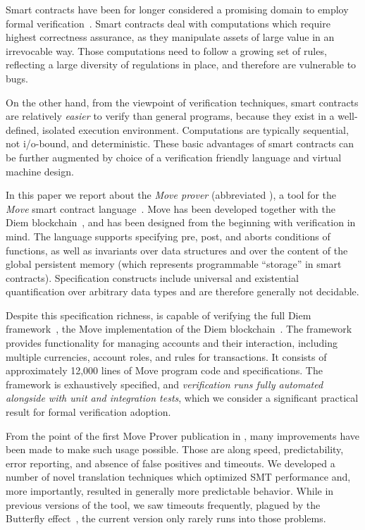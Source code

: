 
Smart contracts have been for longer considered a promising domain to employ
formal verification~\cite{CONTRACT_VERIFICATION}.  Smart contracts deal with
computations which require highest correctness assurance, as they manipulate
assets of large value in an irrevocable way. Those computations need to follow
a growing set of rules, reflecting a large diversity of regulations in place,
and therefore are vulnerable to bugs.

On the other hand, from the viewpoint of verification techniques, smart
contracts are relatively \emph{easier} to verify than general programs,
because they exist in a well-defined, isolated execution environment.
Computations are typically sequential, not i/o-bound, and deterministic.
These basic advantages of smart contracts can be further augmented by
choice of a verification friendly language and virtual machine design.

In this paper we report about the \emph{Move prover} (abbreviated \MVP), a tool
for the \emph{Move} smart contract language~\cite{MOVE_LANG}. Move has been
developed together with the Diem blockchain~\cite{DIEM}, and has been designed
from the beginning with verification in mind.  The language supports specifying
pre, post, and aborts conditions of functions, as well as invariants over data
structures and over the content of the global persistent memory (which
represents programmable ``storage'' in smart contracts). Specification
constructs include universal and existential quantification over arbitrary data
types and are therefore generally not decidable.

Despite this specification richness, \MVP is capable of verifying the full Diem
framework~\cite{DIEM_FRAMEWORK}, the Move implementation of the Diem
blockchain~\cite{DIEM}. The framework provides functionality for managing
accounts and their interaction, including multiple currencies, account roles,
and rules for transactions.  It consists of approximately 12,000 lines of Move
program code and specifications.  The framework is exhaustively specified, and
\emph{verification runs fully automated alongside with unit and integration
  tests}, which we consider a significant practical result for formal
verification adoption.

From the point of the first Move Prover publication in \cite{MOVE_PROVER}, many
improvements have been made to make such usage possible.  Those are along speed,
predictability, error reporting, and absence of false positives and timeouts.
We developed a number of novel translation techniques which optimized SMT
performance and, more importantly, resulted in generally more predictable
behavior. While in previous versions of the tool, we saw timeouts frequently,
plagued by the Butterfly effect~\cite{BUTTERFLY}, the current version only
rarely runs into those problems.

